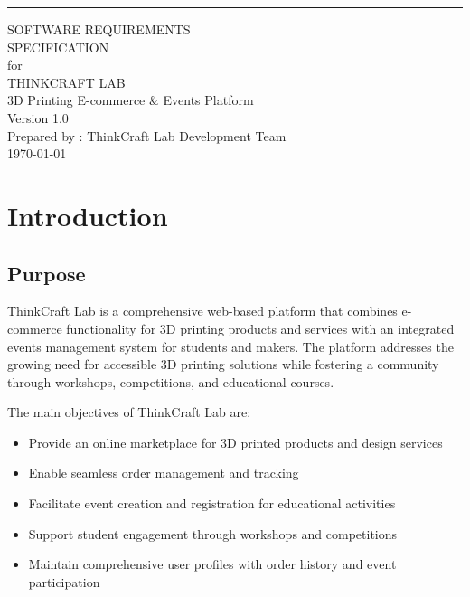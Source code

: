 \documentclass{scrreprt}
\date{}
\def\myversion{1.0 }
\begin{document}
\begin{flushright}
\rule{16cm}{5pt}\vskip1cm
\begin{bfseries}
\Huge{SOFTWARE REQUIREMENTS\\ SPECIFICATION}\\
\vspace{1.5cm}
for\\
\vspace{1.5cm}
THINKCRAFT LAB\\
3D Printing E-commerce \& Events Platform\\
\vspace{1.5cm}
\LARGE{Version \myversion}\\
\vspace{1.5cm}
Prepared by : ThinkCraft Lab Development Team\\
\vspace{1.5cm}
\today\\
\end{bfseries}
\end{flushright}

\tableofcontents


\chapter{Introduction}

\section{Purpose}
ThinkCraft Lab is a comprehensive web-based platform that combines e-commerce functionality for 3D printing products and services with an integrated events management system for students and makers. The platform addresses the growing need for accessible 3D printing solutions while fostering a community through workshops, competitions, and educational courses.

The main objectives of ThinkCraft Lab are:
\begin{itemize}
\item Provide an online marketplace for 3D printed products and design services
\item Enable seamless order management and tracking
\item Facilitate event creation and registration for educational activities
\item Support student engagement through workshops and competitions
\item Maintain comprehensive user profiles with order history and event participation
\end{itemize}
\end{document}
